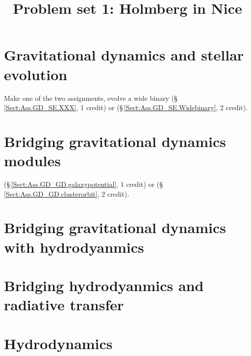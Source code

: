 \documentclass[12pt]{article}
\begin{document}
\title{Problem set 1: Holmberg in Nice}

\maketitle

\section{Gravitational dynamics and stellar evolution}

Make one of the two assignments, evolve a wide binary
(\S\,\ref{Sect:Ass.GD_SE.XXX}, 1 credit) or
(\S\,\ref{Sect:Ass.GD_SE.Widebinary}, 2 credit).



\section{Bridging gravitational dynamics modules}
(\S\,\ref{Sect:Ass.GD_GD.galaxypotential}, 1 credit) or
(\S\,\ref{Sect:Ass.GD_GD.clusterorbit}, 2 credit).

\section{Bridging gravitational dynamics with hydrodyanmics}

\section{Bridging hydrodyanmics and radiative transfer}


\section{Hydrodynamics}




\end{document}
